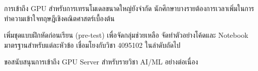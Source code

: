 \documentclass{mko5}
\begin{document}
\closummaryend

\closummaryend

\mkosectionfour
\begin{mkotextblock}
การเข้าถึง GPU สำหรับการเทรนโมเดลขนาดใหญ่ยังจำกัด
นักศึกษาบางรายต้องการเวลาเพิ่มในการทำความเข้าใจทฤษฎีเชิงคณิตศาสตร์เบื้องต้น
\end{mkotextblock}

\mkosectionfive
\begin{mkotextblock}
เพิ่มชุดแบบฝึกหัดก่อนเรียน (pre-test) เพื่อจัดกลุ่มช่วยเหลือ
จัดทำตัวอย่างโค้ดและ Notebook มาตรฐานสำหรับแต่ละหัวข้อ
เชื่อมโยงกับวิชา 4095102 ในลำดับถัดไป
\end{mkotextblock}

\mkosectionsix
\begin{mkotextblock}
ขอสนับสนุนการเข้าถึง GPU Server สำหรับรายวิชา AI/ML อย่างต่อเนื่อง
\end{mkotextblock}

\mkosectionseven
{}
\end{document}
